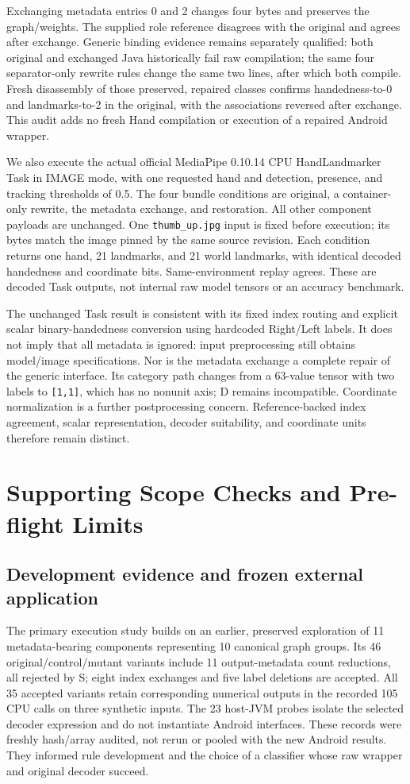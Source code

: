 \documentclass[10pt,twocolumn,letterpaper]{article}
\newcommand{\code}[1]{\texttt{#1}}
\begin{document}
Exchanging metadata entries 0 and 2 changes four bytes and preserves the graph/weights. The supplied role reference disagrees with the original and agrees after exchange. Generic binding evidence remains separately qualified: both original and exchanged Java historically fail raw compilation; the same four separator-only rewrite rules change the same two lines, after which both compile. Fresh disassembly of those preserved, repaired classes confirms handedness-to-0 and landmarks-to-2 in the original, with the associations reversed after exchange. This audit adds no fresh Hand compilation or execution of a repaired Android wrapper.

We also execute the actual official MediaPipe 0.10.14 CPU HandLandmarker Task in IMAGE mode, with one requested hand and detection, presence, and tracking thresholds of 0.5. The four bundle conditions are original, a container-only rewrite, the metadata exchange, and restoration. All other component payloads are unchanged. One \code{thumb\_up.jpg} input is fixed before execution; its bytes match the image pinned by the same source revision. Each condition returns one hand, 21 landmarks, and 21 world landmarks, with identical decoded handedness and coordinate bits. Same-environment replay agrees. These are decoded Task outputs, not internal raw model tensors or an accuracy benchmark.

The unchanged Task result is consistent with its fixed index routing and explicit scalar binary-handedness conversion using hardcoded Right/Left labels. It does not imply that all metadata is ignored: input preprocessing still obtains model/image specifications. Nor is the metadata exchange a complete repair of the generic interface. Its category path changes from a 63-value tensor with two labels to \code{[1,1]}, which has no nonunit axis; D remains incompatible. Coordinate normalization is a further postprocessing concern. Reference-backed index agreement, scalar representation, decoder suitability, and coordinate units therefore remain distinct.

\section{Supporting Scope Checks and Pre-flight Limits}
\label{sec:scope}
\subsection{Development evidence and frozen external application}
The primary execution study builds on an earlier, preserved exploration of 11 metadata-bearing components representing 10 canonical graph groups. Its 46 original/control/mutant variants include 11 output-metadata count reductions, all rejected by S; eight index exchanges and five label deletions are accepted. All 35 accepted variants retain corresponding numerical outputs in the recorded 105 CPU calls on three synthetic inputs. The 23 host-JVM probes isolate the selected decoder expression and do not instantiate Android interfaces. These records were freshly hash/array audited, not rerun or pooled with the new Android results. They informed rule development and the choice of a classifier whose raw wrapper and original decoder succeed.
\end{document}
